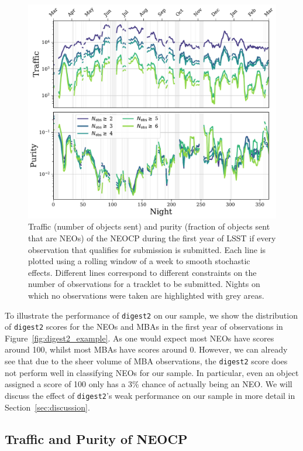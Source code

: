 \documentclass[twocolumn]{aastex631}
\newcommand{\dig}{\texttt{digest2}}
\begin{document}
\begin{figure}[htb]
    \centering
    \includegraphics[width=\textwidth]{traffic_purity.pdf}
    \caption{Traffic (number of objects sent) and purity (fraction of objects sent that are NEOs) of the NEOCP during the first year of LSST if every observation that qualifies for submission is submitted. Each line is plotted using a rolling window of a week to smooth stochastic effects. Different lines correspond to different constraints on the number of observations for a tracklet to be submitted. Nights on which no observations were taken are highlighted with grey areas.}
    \label{fig:neocp_traffic}
\end{figure}

To illustrate the performance of \dig{} on our sample, we show the distribution of \dig{} scores for the NEOs and MBAs in the first year of observations in Figure~\ref{fig:digest2_example}. As one would expect most NEOs have scores around 100, whilst most MBAs have scores around 0. However, we can already see that due to the sheer volume of MBA observations, the \dig{} score does not perform well in classifying NEOs for our sample. In particular, even an object assigned a score of 100 only has a 3\% chance of actually being an NEO. We will discuss the effect of \dig{}'s weak performance on our sample in more detail in Section~\ref{sec:discussion}.

\subsection{Traffic and Purity of NEOCP}\label{sec:traffic_basic}
\end{document}
